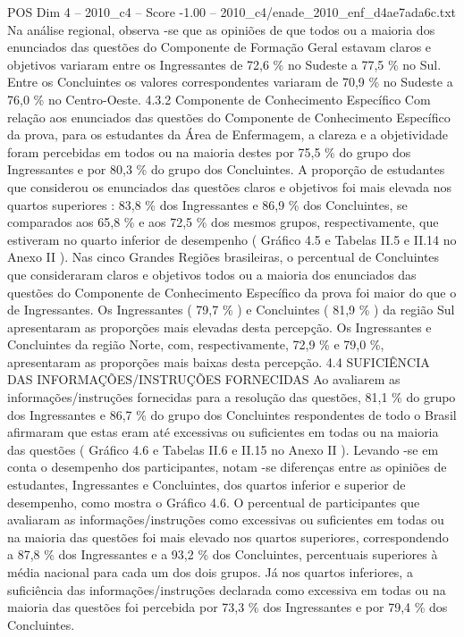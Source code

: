 \begin{textsample}{POS Dim 4 – 2010\_c4 – Score -1.00 – 2010\_c4/enade\_2010\_enf\_d4ae7ada6c.txt}
Na análise regional, observa -se que as opiniões de que todos ou a maioria dos enunciados das questões do Componente de Formação Geral estavam claros e objetivos variaram entre os Ingressantes de 72,6 \% no Sudeste a 77,5 \% no Sul.
Entre os Concluintes os valores correspondentes variaram de 70,9 \% no Sudeste a 76,0 \% no Centro-Oeste. 4.3.2 Componente de Conhecimento Específico Com relação aos enunciados das questões do Componente de Conhecimento Específico da prova, para os estudantes da Área de Enfermagem, a clareza e a objetividade foram percebidas em todos ou na maioria destes por 75,5 \% do grupo dos Ingressantes e por 80,3 \% do grupo dos Concluintes.
A proporção de estudantes que considerou os enunciados das questões claros e objetivos foi mais elevada nos quartos superiores : 83,8 \% dos Ingressantes e 86,9 \% dos Concluintes, se comparados aos 65,8 \% e aos 72,5 \% dos mesmos grupos, respectivamente, que estiveram no quarto inferior de desempenho ( Gráfico 4.5 e Tabelas II.5 e II.14 no Anexo II ).
Nas cinco Grandes Regiões brasileiras, o percentual de Concluintes que consideraram claros e objetivos todos ou a maioria dos enunciados das questões do Componente de Conhecimento Específico da prova foi maior do que o de Ingressantes.
Os Ingressantes ( 79,7 \% ) e Concluintes ( 81,9 \% ) da região Sul apresentaram as proporções mais elevadas desta percepção.
Os Ingressantes e Concluintes da região Norte, com, respectivamente, 72,9 \% e 79,0 \%, apresentaram as proporções mais baixas desta percepção. 4.4 SUFICIÊNCIA DAS INFORMAÇÕES/INSTRUÇÕES FORNECIDAS Ao avaliarem as informações/instruções fornecidas para a resolução das questões, 81,1 \% do grupo dos Ingressantes e 86,7 \% do grupo dos Concluintes respondentes de todo o Brasil afirmaram que estas eram até excessivas ou suficientes em todas ou na maioria das questões ( Gráfico 4.6 e Tabelas II.6 e II.15 no Anexo II ).
Levando -se em conta o desempenho dos participantes, notam -se diferenças entre as opiniões de estudantes, Ingressantes e Concluintes, dos quartos inferior e superior de desempenho, como mostra o Gráfico 4.6.
O percentual de participantes que avaliaram as informações/instruções como excessivas ou suficientes em todas ou na maioria das questões foi mais elevado nos quartos superiores, correspondendo a 87,8 \% dos Ingressantes e a 93,2 \% dos Concluintes, percentuais superiores à média nacional para cada um dos dois grupos.
Já nos quartos inferiores, a suficiência das informações/instruções declarada como excessiva em todas ou na maioria das questões foi percebida por 73,3 \% dos Ingressantes e por 79,4 \% dos Concluintes.

\end{textsample}
